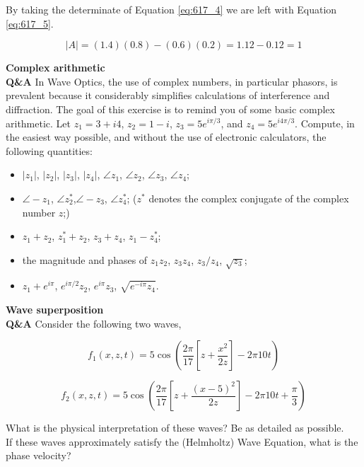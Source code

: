 \documentclass[main.tex]{subfiles}
\begin{document}
By taking the determinate of Equation \ref{eq:617_4} we are left with Equation \ref{eq:617_5}.

\begin{equation}\label{eq:617_5}
|A|= (1.4)(0.8) - (0.6)(0.2) = 1.12 - 0.12 = 1
\end{equation}

\textbf{Complex arithmetic}\\
\textbf{Q\&A} In Wave Optics, the use of complex numbers, in particular phasors, is prevalent because it considerably simplifies calculations of interference and diffraction. The goal of this exercise is to remind you of some basic complex arithmetic. Let $z_1 = 3 + i4$, $z_2 = 1-i$, $z_3 = 5e^{i\pi /3}$, and $z_4=5e^{i4\pi/3}$. Compute, in the easiest way possible, and without the use of electronic calculators, the following quantities:

\begin{itemize}
  \item $|z_1|$, $|z_2|$, $|z_3|$, $|z_4|$, $\angle z_1$, $\angle z_2$, $\angle z_3$, $\angle z_4$;
  \item $\angle -z_1$, $\angle z_2^*$,$\angle -z_3$, $\angle z_4^*$; ($z^*$ denotes the complex conjugate of the complex number $z$;)
  \item $z_1 + z_2$, $z_1^* + z_2$, $z_3 + z_4$, $z_1 - z_4^*$;
  \item the magnitude and phases of  $z_1 z_2$, $z_3 z_4$, $z_3 / z_4$, $\sqrt{z_3}$;
  \item $z_1 + e^{i \pi}$, $e^{i \pi / 2}z_2$, $e^{i\pi}z_3$, $\sqrt{e^{-i\pi}z_4}$.
\end{itemize}

\textbf{Wave superposition}\\
\textbf{Q\&A} Consider the following two waves,

\begin{equation}\label{eq:ws_1}
f_1(x,z,t) = 5\cos \left(\frac{2 \pi}{17} \left[ z+\frac{x^2}{2z} \right] -2\pi 10t \right)
\end{equation}

\begin{equation}\label{eq:ws_2}
f_2(x,z,t) = 5\cos \left(\frac{2 \pi}{17} \left[ z+\frac{(x-5)^2}{2z} \right] -2\pi 10t + \frac{\pi}{3} \right)
\end{equation}

What is the physical interpretation of these waves? Be as detailed as possible.\\

If these waves approximately satisfy the (Helmholtz) Wave Equation, what is the phase velocity?\\
\end{document}
